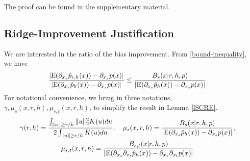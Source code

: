 \documentclass[aos,preprint]{imsart}
\theoremstyle{remark}
\begin{document}
The proof can be found in the supplementary material.

\subsection{Ridge-Improvement Justification}
We are interested in the ratio of the bias improvement. From \eqref{bound-inequality}, we have
\[
\frac{|{\rm E}( \partial_{x_s}  \hat{p}_{r,h}(x)) -  \partial_{x_s } p(x)|}{|{\rm E}( \partial_{x_s}  \hat{p}_{h}(x)) -  \partial_{x_s } p(x)|} \leq \frac{B_s(x| r,h, p)}{|{\rm E}( \partial_{x_s}  \hat{p}_{h}(x)) -  \partial_{x_s } p(x)|}
\]
For notational convenience, we bring in three notations, $\gamma, \mu_s(x,r,h), \mu_{s,t}(x,r,h)$, to simplify the result in Lemma \ref{lSCRE}.
\begin{gather*}
\gamma(r,h) = \frac{\int_{\|u\|\geq r/h } \|u\|_2^2 K(u) du}{ 2\int_{\|u\|\geq r/h} K(u) du }, \quad
\mu_s(x,r,h) = \frac{B_s(x| r,h, p)}{|{\rm E}( \partial_{x_s}  \hat{p}_{h}(x)) -  \partial_{x_s } p(x)|},\\
\mu_{s,t}(x,r,h) = \frac{B_{s,t}(x| r,h, p)}{|{\rm E}( \partial_{x_s}\partial_{x_t}  \hat{p}_{h}(x)) -  \partial_{x_s } \partial_{x_t}p(x)|}
\end{gather*}
\end{document}
